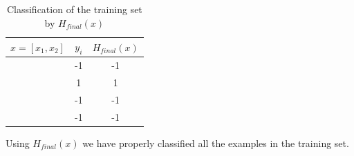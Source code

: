 \documentclass[11pt]{article}
\begin{document}
\begin{table}[H]
\centering
{\renewcommand{\arraystretch}{1.2}%
\begin{tabular}{| c | c | c |}
\hline
$x = [x_1, x_2]$& $y_i$ & $H_{final}(x)$\\
\hline
[1,1] & -1 & -1\\ \hline
[1,-1] & 1 & 1\\ \hline
[-1,-1] & -1 & -1\\ \hline
[-1,1] & -1 & -1\\ \hline
\end{tabular}}
\caption{Classification of the training set by $H_{final}(x)$}
\end{table}

Using $H_{final}(x)$ we have properly classified all the examples in the training set.
\end{document}
